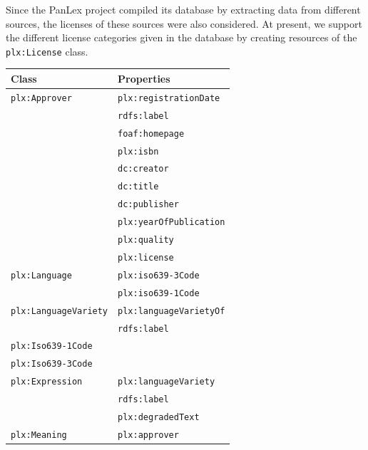 \documentclass[sw]{iosart2c}
\begin{document}
Since the PanLex project compiled its database by extracting data from different sources, the licenses of these sources were also considered.
At present, we support the different license categories given in the database by creating resources of the \texttt{\small plx:License} class.
\begin{table}
\begin{scriptsize}
\begin{tabular}{ll}
Class & Properties \\
\toprule
\texttt{plx:Approver} & \texttt{plx:registrationDate} \\
                      & \texttt{rdfs:label} \\
                      & \texttt{foaf:homepage} \\
                      & \texttt{plx:isbn} \\
                      & \texttt{dc:creator} \\
                      & \texttt{dc:title} \\
                      & \texttt{dc:publisher} \\
                      & \texttt{plx:yearOfPublication} \\
                      & \texttt{plx:quality} \\
                      & \texttt{plx:license} \\
\midrule
\texttt{plx:Language}
                      & \texttt{plx:iso639-3Code} \\
                      & \texttt{plx:iso639-1Code} \\
\midrule
\texttt{plx:LanguageVariety}
                      & \texttt{plx:languageVarietyOf} \\
                      & \texttt{rdfs:label} \\
\midrule
\texttt{plx:Iso639-1Code} & \\
\midrule
\texttt{plx:Iso639-3Code} & \\
\midrule
\texttt{plx:Expression}
                      & \texttt{plx:languageVariety} \\
                      & \texttt{rdfs:label} \\
                      & \texttt{plx:degradedText} \\
\midrule
\texttt{plx:Meaning}
                      & \texttt{plx:approver} \\

\end{tabular}
\end{scriptsize}
\end{table}
\end{document}
